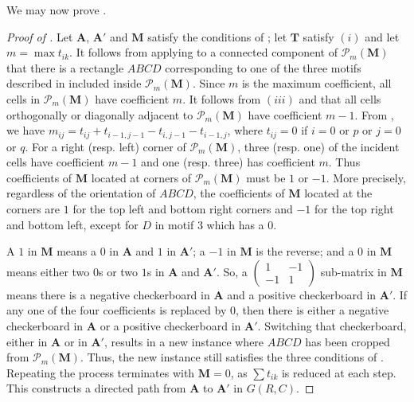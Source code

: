 \documentclass{article}
\renewcommand{\P}{\mathcal P}
\newcommand{\A}{\mathbf A}
\newcommand{\M}{\mathbf M}
\newcommand{\T}{\mathbf T}
\begin{document}
We may now prove .

\begin{proof}[Proof of ]
Let $\A$, $\A'$ and $\M$ satisfy the conditions of ; let $\T$ satisfy $(i)$ and let $m=\max t_{ik}$. It follows from applying  to a connected component of $\P_m(\M)$ that there is a rectangle $ABCD$ corresponding to one of the three motifs described in  included inside $\P_m(\M)$. Since $m$ is the maximum coefficient, all cells in $\P_m(\M)$ have coefficient $m$. It follows from $(iii)$ and  that all cells orthogonally or diagonally adjacent to $\P_m(\M)$ have coefficient $m-1$. From , we have $m_{ij}=t_{ij}+t_{i-1,j-1}-t_{i,j-1}-t_{i-1,j}$, where $t_{ij}=0$ if $i=0$ or $p$ or $j=0$ or $q$. For a right (resp. left) corner of $\P_m(\M)$, three (resp. one) of the incident cells have coefficient $m-1$ and one (resp. three) has coefficient $m$. Thus coefficients of $\M$ located at corners of $\P_m(\M)$ must be $1$ or $-1$. More precisely, regardless of the orientation of $ABCD$, the coefficients of $\M$ located at the corners are $1$ for the top left and bottom right corners and $-1$ for the top right and bottom left, except for $D$ in motif 3 which has a $0$.

A $1$ in $\M$ means a $0$ in $\A$ and $1$ in $\A'$; a $-1$ in $\M$ is the reverse; and a $0$ in $\M$ means either two $0$s or two $1$s in $\A$ and $\A'$. So, a $\begin{pmatrix}
1 & -1\\
-1 & 1
\end{pmatrix}$ sub-matrix in $\M$ means there is a negative checkerboard in $\A$ and a positive checkerboard in $\A'$. If any one of the four coefficients is replaced by $0$, then there is either a negative checkerboard in $\A$ or a positive checkerboard in $\A'$. Switching that checkerboard, either in $\A$ or in $\A'$, results in a new instance where $ABCD$ has been cropped from $\P_m(\M)$. Thus, the new instance still satisfies the three conditions of . Repeating the process terminates with $\M=0$, as $\sum t_{ik}$ is reduced at each step. This constructs a directed path from $\A$ to $\A'$ in $G(R,C)$.
\end{proof}





\end{document}
